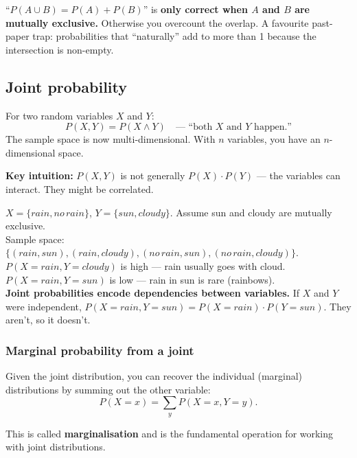 \documentclass[11pt, a4paper]{article}
\begin{document}
\begin{trapbox}
``$P(A \cup B) = P(A) + P(B)$'' is \textbf{only correct when $A$ and $B$ are mutually exclusive.} Otherwise you overcount the overlap. A favourite past-paper trap: probabilities that ``naturally'' add to more than 1 because the intersection is non-empty.
\end{trapbox}

\subsection{Joint probability}

\begin{defbox}
For two random variables $X$ and $Y$:
\[
P(X, Y) = P(X \land Y) \quad \text{— ``both $X$ and $Y$ happen.''}
\]
The sample space is now multi-dimensional. With $n$ variables, you have an $n$-dimensional space.
\end{defbox}

\textbf{Key intuition:} $P(X, Y)$ is not generally $P(X) \cdot P(Y)$ — the variables can interact. They might be correlated.

\begin{exbox}
$X = \{rain, no\,rain\}$, $Y = \{sun, cloudy\}$. Assume sun and cloudy are mutually exclusive.\\[0.3em]
Sample space: $\{(rain, sun), (rain, cloudy), (no\,rain, sun), (no\,rain, cloudy)\}$.\\[0.3em]
$P(X = rain, Y = cloudy)$ is high — rain usually goes with cloud.\\
$P(X = rain, Y = sun)$ is low — rain in sun is rare (rainbows).\\[0.3em]
\textbf{Joint probabilities encode dependencies between variables.} If $X$ and $Y$ were independent, $P(X = rain, Y = sun) = P(X = rain) \cdot P(Y = sun)$. They aren't, so it doesn't.
\end{exbox}

\subsubsection*{Marginal probability from a joint}

Given the joint distribution, you can recover the individual (marginal) distributions by summing out the other variable:
\[
P(X = x) = \sum_y P(X = x, Y = y).
\]

This is called \textbf{marginalisation} and is the fundamental operation for working with joint distributions.
\end{document}

